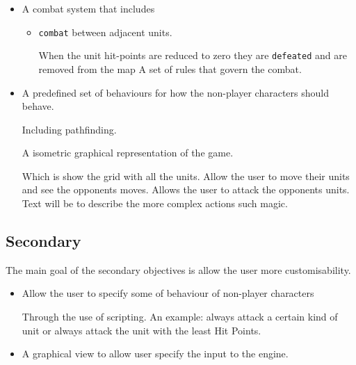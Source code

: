 \begin{itemize}
\begin{itemize}
	\item A combat system that includes
		\begin{itemize}
			\item \texttt{combat} between adjacent units.
			\begin{itemize}
				\cross When the unit hit-points are reduced to zero they are \texttt{defeated} and are removed from the map
			\tick A set of rules that govern the combat.
			\end{itemize}
			
		\end{itemize}
	
	\item A predefined set of behaviours for how the non-player characters should behave.
	\begin{itemize}
		\tick Including pathfinding.
	\end{itemize}
	
	\tick A isometric graphical representation of the game.
	\begin{itemize}
		\tick Which is show the grid with all the units.
		\tick Allow the user to move their units and see the opponents moves.
		\tick Allows the user to attack the opponents units.
		\tick Text will be to describe the more complex actions such magic.
	\end{itemize}
\end{itemize}
\end{itemize}

\subsection{Secondary}
\label{secondary}
The main goal of the secondary objectives is allow the user more customisability. 
\begin{itemize}
	\tick Tile have \texttt{height}, where units can only move to tiles of a smilier height.
	\cross Tiles that are not passable such as sea, lava, etc.
	
	\tick Tiles have different movement costs associated with them.
		
	\cross Long distance weapons\slash magic for player and AI.
	
	\cross Direction and height of the character's tile affects attack.
	
	\tick Sound effects.
	
	\tick Music.
	
	\cross Saving and loading games.
	
	\item Allow the user to specify some of behaviour of non-player characters
	\begin{itemize}
		\cross Through the use of scripting.
		\cross An example: always attack a certain kind of unit or always attack the unit with the least Hit Points.
	\end{itemize}
	
	\item A graphical view to allow user specify the input to the engine.
\end{itemize}

